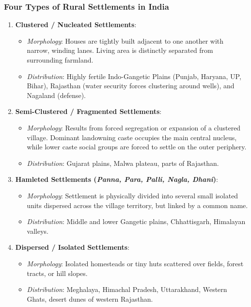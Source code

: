 \documentclass[11pt,a4paper]{article}
\begin{document}
\subsubsection{Four Types of Rural Settlements in India}
\begin{enumerate}[leftmargin=*]
  \item \textbf{Clustered / Nucleated Settlements}:
  \begin{itemize}
    \item \textit{Morphology}: Houses are tightly built adjacent to one another with narrow, winding lanes. Living area is distinctly separated from surrounding farmland.
    \item \textit{Distribution}: Highly fertile Indo-Gangetic Plains (Punjab, Haryana, UP, Bihar), Rajasthan (water security forces clustering around wells), and Nagaland (defense).
  \end{itemize}

  \item \textbf{Semi-Clustered / Fragmented Settlements}:
  \begin{itemize}
    \item \textit{Morphology}: Results from forced segregation or expansion of a clustered village. Dominant landowning caste occupies the main central nucleus, while lower caste social groups are forced to settle on the outer periphery.
    \item \textit{Distribution}: Gujarat plains, Malwa plateau, parts of Rajasthan.
  \end{itemize}

  \item \textbf{Hamleted Settlements (\textit{Panna, Para, Palli, Nagla, Dhani})}:
  \begin{itemize}
    \item \textit{Morphology}: Settlement is physically divided into several small isolated units dispersed across the village territory, but linked by a common name.
    \item \textit{Distribution}: Middle and lower Gangetic plains, Chhattisgarh, Himalayan valleys.
  \end{itemize}

  \item \textbf{Dispersed / Isolated Settlements}:
  \begin{itemize}
    \item \textit{Morphology}: Isolated homesteads or tiny huts scattered over fields, forest tracts, or hill slopes.
    \item \textit{Distribution}: Meghalaya, Himachal Pradesh, Uttarakhand, Western Ghats, desert dunes of western Rajasthan.
  \end{itemize}
\end{enumerate}
\end{document}
